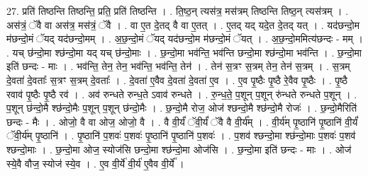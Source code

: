 \documentclass[17pt]{extarticle}
\begin{document}
27. प्रति॑ तिष्ठन्ति तिष्ठन्ति॒ प्रति॒ प्रति॑ तिष्ठन्ति । . ति॒ष्ठ॒न् त्यस॑त्र॒ मस॑त्रम् तिष्ठन्ति तिष्ठ॒न् त्यस॑त्रम् । . अस॑त्रं॒ ॅवै वा अस॑त्र॒ मस॑त्रं॒ ॅवै । . वा ए॒त दे॒तद् वै वा ए॒तत् । . ए॒तद् यद् यदे॒त दे॒तद् यत् । . यद॑छन्दो॒म म॑छन्दो॒मं ॅयद् यद॑छन्दो॒मम् । . अ॒छ॒न्दो॒मं ॅयद् यद॑छन्दो॒म म॑छन्दो॒मं ॅयत् । . अ॒छ॒न्दो॒ममित्य॑छन्दः - मम् । . यच् छ॑न्दो॒मा श्छ॑न्दो॒मा यद् यच् छ॑न्दो॒माः । . छ॒न्दो॒मा भव॑न्ति॒ भव॑न्ति छन्दो॒मा श्छ॑न्दो॒मा भव॑न्ति । . छ॒न्दो॒मा इति॑ छन्दः - माः । . भव॑न्ति॒ तेन॒ तेन॒ भव॑न्ति॒ भव॑न्ति॒ तेन॑ । . तेन॑ स॒त्रꣳ स॒त्रम् तेन॒ तेन॑ स॒त्रम् । . स॒त्रम् दे॒वता॑ दे॒वताः᳚ स॒त्रꣳ स॒त्रम् दे॒वताः᳚ । . दे॒वता॑ ए॒वैव दे॒वता॑ दे॒वता॑ ए॒व । . ए॒व पृ॒ष्ठैः पृ॒ष्ठै रे॒वैव पृ॒ष्ठैः । . पृ॒ष्ठै रवाव॑ पृ॒ष्ठैः पृ॒ष्ठै रव॑ । . अव॑ रुन्धते रुन्ध॒ते ऽवाव॑ रुन्धते । . रु॒न्ध॒ते॒ प॒शून् प॒शून् रु॑न्धते रुन्धते प॒शून् । . प॒शून् छ॑न्दो॒मै श्छ॑न्दो॒मैः प॒शून् प॒शून् छ॑न्दो॒मैः । . छ॒न्दो॒मै रोज॒ ओज॑ श्छन्दो॒मै श्छ॑न्दो॒मै रोजः॑ । . छ॒न्दो॒मैरिति॑ छन्दः - मैः । . ओजो॒ वै वा ओज॒ ओजो॒ वै । . वै वी॒र्यं॑ ॅवी॒र्यं॑ ॅवै वै वी॒र्य᳚म् । . वी॒र्य॑म् पृ॒ष्ठानि॑ पृ॒ष्ठानि॑ वी॒र्यं॑ ॅवी॒र्य॑म् पृ॒ष्ठानि॑ । . पृ॒ष्ठानि॑ प॒शवः॑ प॒शवः॑ पृ॒ष्ठानि॑ पृ॒ष्ठानि॑ प॒शवः॑ । . प॒शव॑ श्छन्दो॒मा श्छ॑न्दो॒माः प॒शवः॑ प॒शव॑ श्छन्दो॒माः । . छ॒न्दो॒मा ओज॒ स्योज॑सि छन्दो॒मा श्छ॑न्दो॒मा ओज॑सि । . छ॒न्दो॒मा इति॑ छन्दः - माः । . ओज॑ स्ये॒वै वौज॒ स्योज॑ स्ये॒व । . ए॒व वी॒र्ये॑ वी॒र्य॑ ए॒वैव वी॒र्ये᳚ । \newline
\end{document}
